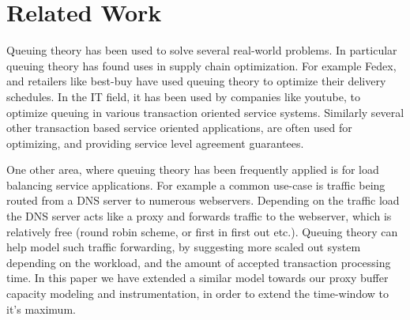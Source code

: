 \section{Related Work}
\label{sec:related}

Queuing theory has been used to solve several real-world problems. 
In particular queuing theory has found uses in supply chain optimization.
For example Fedex, and retailers like best-buy have used queuing theory to optimize their delivery schedules.
In the IT field, it has been used by companies like youtube, to optimize queuing in various transaction oriented service systems.
Similarly several other transaction based service oriented applications, are often used for optimizing, and providing service level agreement guarantees.

One other area, where queuing theory has been frequently applied is for load balancing service applications.
For example a common use-case is traffic being routed from a DNS server to numerous webservers. 
Depending on the traffic load the DNS server acts like a proxy and forwards traffic to the webserver, which is relatively free (round robin scheme, or first in first out etc.).
Queuing theory can help model such traffic forwarding, by suggesting more scaled out system depending on the workload, and the amount of accepted transaction processing time.
In this paper we have extended a similar model towards our proxy buffer capacity modeling and instrumentation, in order to extend the time-window to it's maximum.